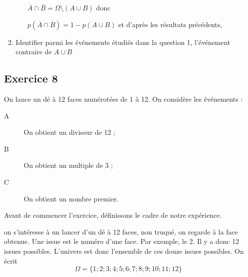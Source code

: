 \documentclass[openany]{book}
\begin{document}
\begin{enumerate}
\begin{enumerate}
	$\overline{A} \cap \overline{B} = \Omega \setminus (A \cup B)$  donc 
	
	
	$p(\overline{A} \cap \overline{B}) = 1- p(A \cup B)$ et d'après les résultats précédents,  
	
	\end{enumerate}
	
\item Identifier parmi les événements étudiés dans la question 1, l'événement contraire de $A \cup B$



\end{enumerate}

 

\newpage



\subsection{Exercice 8}
 
On lance un dé à 12 faces numérotées de 1 à 12. On considère les événements :

\begin{description}
\item[A] On obtient un diviseur de 12 ;
\item[B] On obtient un multiple de 3 ;
\item[C] On obtient un nombre premier.
\end{description}

Avant de commencer l'exercice, définissons le cadre de notre expérience.

on s'intéresse à un lancer d'un dé à 12 faces, non truqué, on regarde à la face obtenue.
Une issue est le numéro d'une face. Par exemple, le 2. Il y a donc 12 issues possibles. L'univers est donc l'ensemble de ces douze issues possibles.
On écrit $$ \Omega = \lbrace 1;2;3;4;5;6;7;8;9;10;11;12\rbrace$$
\end{document}
